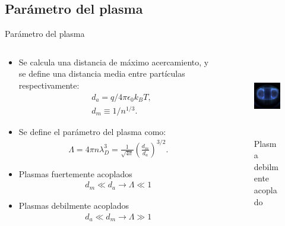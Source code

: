\documentclass[11pt]{beamer}
\begin{document}
    \subsection{Par\'ametro del plasma}
        \begin{frame}{Par\'ametro del plasma}
        \fontsize{7pt}{9}\selectfont
        \begin{columns}
        \begin{column}{0.4\textwidth}
        \begin{block}{}        
        \begin{itemize}
            \item Se calcula una distancia de máximo acercamiento, y se define una distancia media entre partículas respectivamente:
            \begin{align*}
            &d_a = q/4\pi\epsilon_0k_BT,\\
            &d_m \equiv 1/n^{1/3}.
            \end{align*}
            \item Se define el par\'ametro del plasma como:
            \begin{align*}
             \Lambda = 4\pi n\lambda^3_D = \frac{1}{\sqrt{4\pi}}\left(\frac{d_m}{d_a}\right)^{3/2}.
            \end{align*}
            \item Plasmas fuertemente acoplados
            \begin{align*}
            d_m \ll d_a \rightarrow \Lambda \ll 1
            \end{align*}
            \item Plasmas debilmente acoplados
            \begin{align*}
                d_a \ll d_m \rightarrow \Lambda \gg 1
            \end{align*}
        \end{itemize}
        \end{block}
        \end{column}
        
        \begin{column}{0.4\textwidth}
        \begin{figure}
            \centering
            \includegraphics[width=\textwidth, height=3.5cm]{parametro_plasma.jpeg}
            \caption{Plasma debilmente acoplado}
            \label{fig:my_label}
        \end{figure}
        \end{column}
        \end{columns}
        
        \end{frame}
\end{document}
